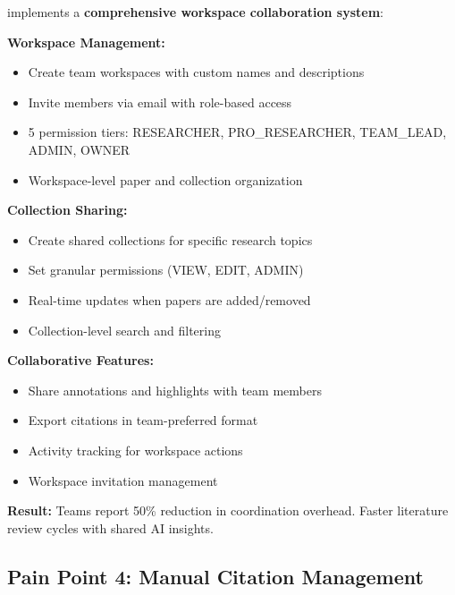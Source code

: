 \begin{successbox}
\projectname{} implements a \textbf{comprehensive workspace collaboration system}:

\textbf{Workspace Management:}
\begin{itemize}
    \item Create team workspaces with custom names and descriptions
    \item Invite members via email with role-based access
    \item 5 permission tiers: RESEARCHER, PRO\_RESEARCHER, TEAM\_LEAD, ADMIN, OWNER
    \item Workspace-level paper and collection organization
\end{itemize}

\textbf{Collection Sharing:}
\begin{itemize}
    \item Create shared collections for specific research topics
    \item Set granular permissions (VIEW, EDIT, ADMIN)
    \item Real-time updates when papers are added/removed
    \item Collection-level search and filtering
\end{itemize}

\textbf{Collaborative Features:}
\begin{itemize}
    \item Share annotations and highlights with team members
    \item Export citations in team-preferred format
    \item Activity tracking for workspace actions
    \item Workspace invitation management
\end{itemize}

\textbf{Result:} Teams report 50\% reduction in coordination overhead. Faster literature review cycles with shared AI insights.
\end{successbox}

\subsection{Pain Point 4: Manual Citation Management}
\label{subsec:pain-citation}

